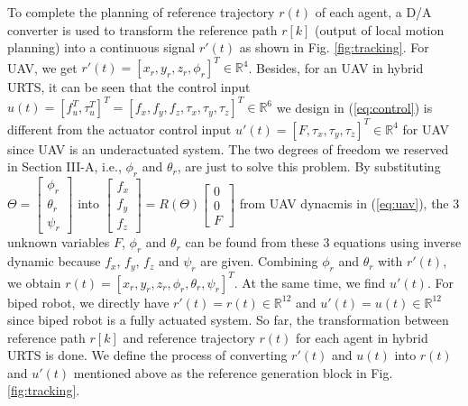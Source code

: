\documentclass{ieeeaccess}
\begin{document}
To complete the planning of reference trajectory $r(t)$ of each agent, a D/A converter is used to transform the reference path $r[k]$ (output of local motion planning) into a continuous signal $r'(t)$ as shown in Fig. \ref{fig:tracking}. For UAV, we get $r'(t) = [x_r, y_r, z_r, \phi_r]^T\in\mathbb{R}^{4}$. Besides, for an UAV in hybrid URTS, it can be seen that the control input $u(t)=[f_u^T, \tau_u^T]^T = [f_x, f_y, f_z, \tau_x, \tau_y, \tau_z]^T\in\mathbb{R}^6$ we design in (\ref{eq:control}) is different from the actuator control input $u'(t)=[F, \tau_x, \tau_y, \tau_z]^T\in\mathbb{R}^4$ for UAV since UAV is an underactuated system. The two degrees of freedom we reserved in Section III-A, i.e., $\phi_r$ and $\theta_r$, are just to solve this problem. By substituting $\Theta=\begin{bmatrix}
    \phi_r \\ \theta_r \\ \psi_r
\end{bmatrix}$ into $\begin{bmatrix}
        f_x \\ f_y \\ f_z
\end{bmatrix} = R(\Theta)\begin{bmatrix}
        0 \\ 0 \\ F
\end{bmatrix}$ from UAV dynacmis in (\ref{eq:uav}), the 3 unknown variables $F$, $\phi_r$ and $\theta_r$ can be found from these 3 equations using inverse dynamic because $f_x$, $f_y$, $f_z$ and $\psi_r$ are given. Combining $\phi_r$ and $\theta_r$ with $r'(t)$, we obtain $r(t)= [x_r, y_r, z_r, \phi_r, \theta_r, \psi_r]^T$. At the same time, we find $u'(t)$. For biped robot, we directly have $r'(t)=r(t)\in\mathbb{R}^{12}$ and $u'(t)=u(t)\in\mathbb{R}^{12}$ since biped robot is a fully actuated system. So far, the transformation between reference path $r[k]$ and reference trajectory $r(t)$ for each agent in hybrid URTS is done. We define the process of converting $r'(t)$ and $u(t)$ into $r(t)$ and $u'(t)$ mentioned above as the reference generation block in Fig. \ref{fig:tracking}.
\end{document}
